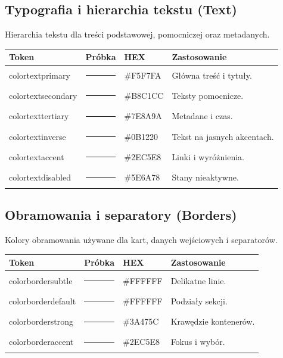 \subsection{Typografia i hierarchia tekstu (Text)}
Hierarchia tekstu dla treści podstawowej, pomocniczej oraz metadanych.

\begin{table}[H]
\centering
\small
\begin{tabular}{|l|c|l|p{6.5cm}|}
\hline
\textbf{Token} & \textbf{Próbka} & \textbf{HEX} & \textbf{Zastosowanie} \\ \hline
\/color\/text\/primary & {\color{textColorPrimary}\rule{0.8cm}{0.4cm}} & \#F5F7FA & Główna treść i tytuły. \\ \hline
\/color\/text\/secondary & {\color{textColorSecondary}\rule{0.8cm}{0.4cm}} & \#B8C1CC & Teksty pomocnicze. \\ \hline
\/color\/text\/tertiary & {\color{textColorTertiary}\rule{0.8cm}{0.4cm}} & \#7E8A9A & Metadane i czas. \\ \hline
\/color\/text\/inverse & {\color{textColorInverse}\rule{0.8cm}{0.4cm}} & \#0B1220 & Tekst na jasnych akcentach. \\ \hline
\/color\/text\/accent & {\color{textColorAccent}\rule{0.8cm}{0.4cm}} & \#2EC5E8 & Linki i wyróżnienia. \\ \hline
\/color\/text\/disabled & {\color{textColorDisabled}\rule{0.8cm}{0.4cm}} & \#5E6A78 & Stany nieaktywne. \\ \hline
\end{tabular}
\end{table}

\subsection{Obramowania i separatory (Borders)}
Kolory obramowania używane dla kart, danych wejściowych i separatorów.

\begin{table}[H]
\centering
\small
\begin{tabular}{|l|c|l|l|}
\hline
\textbf{Token} & \textbf{Próbka} & \textbf{HEX} & \textbf{Zastosowanie} \\ \hline
\/color\/border\/subtle & {\color{borderColorSubtle}\rule{0.8cm}{0.4cm}} & \#FFFFFF & Delikatne linie. \\ \hline
\/color\/border\/default & {\color{borderColorSubtle}\rule{0.8cm}{0.4cm}} & \#FFFFFF & Podziały sekcji. \\ \hline
\/color\/border\/strong & {\color{borderColorStrong}\rule{0.8cm}{0.4cm}} & \#3A475C & Krawędzie kontenerów. \\ \hline
\/color\/border\/accent & {\color{borderColorAccent}\rule{0.8cm}{0.4cm}} & \#2EC5E8 & Fokus i wybór. \\ \hline
\end{tabular}
\end{table}

